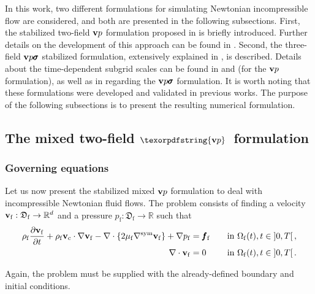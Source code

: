\documentclass[11pt,english]{article}
\def\alevelocity{\vb{v}_{\mathrm{c}}}
\def\densfluid{\rho_{\rm{f}}}                %
\def\viscfluid{\mu_{\rm{f}}}                 %
\def\domainfluid{\Omega_{\rm{f}}}
\def\vfluid{\vb{v}_{\rm{f}}}               %
\def\pfluid{p_{\mathrm{f}}}                %
\def\bodyffluid{\pmb{f}_{\rm{f}}}          %
\def\vpsigma{\vb{v}p\pmb{\sigma}}
\def\vp{\vb{v}p}
\def\timeint{\left ] 0,T\right[}                         %
\begin{document}
In this work, two different formulations for simulating Newtonian incompressible flow are considered, and both are presented in the following subsections. First, the stabilized two-field $\vp$ formulation proposed in \cite{Codina2001} is briefly introduced. Further details on the development of this approach can be found in \cite{CodinaVMS}. Second, the three-field $\vpsigma$ stabilized formulation, extensively explained in \cite{ErnestoRamon2014}, is described. Details about the time-dependent subgrid scales can be found in \cite{CodinaPrincipeDynamicSGS} and \cite{CastilloCodina2018} (for the $\vp$ formulation), as well as in \cite{moreno2020solution} regarding the $\vpsigma$ formulation. It is worth noting that these formulations were developed and validated in previous works. The purpose of the following subsections is to present the resulting numerical formulation.

%
%
\subsection{The mixed two-field $\texorpdfstring{\vp}~$ formulation\label{subsec:vp_formulation}}

\subsubsection{Governing equations}

Let us now present the stabilized mixed $\vp$ formulation to deal with incompressible Newtonian fluid flows. The problem consists of finding a velocity $\vfluid:\mathfrak{D}_{\mathrm{f}} \to \mathbb{R}^d$ and a pressure $\pfluid:\mathfrak{D}_{\mathrm{f}} \to \mathbb{R}$ such that
\begin{align}
    \densfluid\frac{\partial \vfluid}{\partial t} + \densfluid \alevelocity \cdot \nabla \vfluid  - \nabla \cdot \left \lbrace 2\viscfluid \nabla^\mathrm{sym} \vfluid \right \rbrace + \nabla \pfluid &= \bodyffluid \quad &&\hbox{in}~\domainfluid(t) , t \in \timeint, \label{eq:nstinc_momentum_equation_vp}\\
    \nabla \cdot \vfluid &= 0 \quad &&\hbox{in}~\domainfluid(t) , t \in \timeint.\label{eq:incompressibility_equation_vp}
\end{align}

Again, the problem must be supplied with the already-defined boundary and initial conditions.
\end{document}
